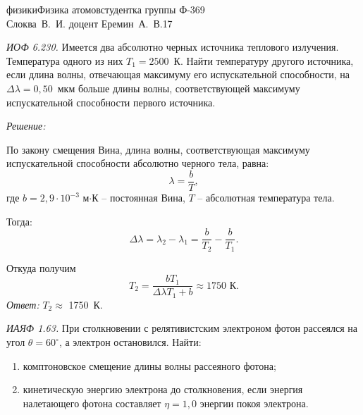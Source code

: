 



\renewcommand{\labelenumi}{\asbuk{enumi})}


{физики}{Физика атомов}{студентка группы Ф-369\\Слоква~В.~И.}
{доцент Еремин~А.~В.}{\!\!}{17}
\newpage

\emph{ИОФ 6.230.}
Имеется два абсолютно черных источника теплового излучения. Температура
одного из них \( T_1 = 2500 \)~К. Найти температуру другого источника, если
длина волны, отвечающая максимуму его испускательной способности, на
\( \Delta\lambda = 0,50 \)~мкм больше длины волны, соответствующей максимуму
испускательной способности первого источника.

\vspace*{2em}
\emph{Решение:}

По закону смещения Вина, длина волны, соответствующая максимуму
испускательной способности абсолютно черного тела, равна:
\[
  \lambda = \frac{b}{T},
\]
где \( b = 2,9 \cdot 10^{-3} \) м\(\cdot\)К -- постоянная Вина,
\( T \) -- абсолютная температура тела.

Тогда:
\[
  \Delta\lambda = \lambda_2 - \lambda_1 = \frac{b}{T_2} - \frac{b}{T_1}.
\]

Откуда получим
\[
  T_2 = \frac{bT_1}{\Delta\lambda T_1 + b} \approx 1750 \text{ К}.
\]
\vspace*{2em}
\emph{Ответ:}
\( T_2 \approx \) 1750~К.
\newpage

\emph{ИАЯФ 1.63.}
При столкновении с релятивистским электроном фотон рассеялся
на угол \( \theta = 60^\circ \), а электрон остановился. Найти:
\vspace*{-.9em}
\begin{enumerate} \itemsep-.5em
    \item комптоновское смещение длины волны рассеяного фотона;
    \item кинетическую энергию электрона до столкновения, если энергия
    налетающего фотона составляет \( \eta = 1,\!0 \) энергии покоя электрона.
\end{enumerate}

